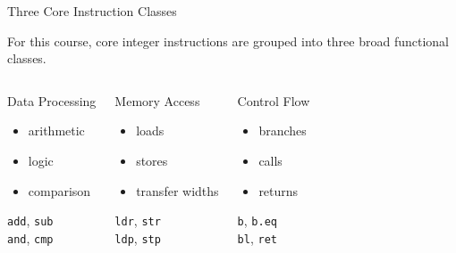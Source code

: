 \documentclass[aspectratio=169,11pt,t]{beamer}
\newcommand{\code}[1]{\texttt{#1}}
\begin{document}
\begin{frame}{Three Core Instruction Classes}

For this course,
core integer instructions
are grouped into three broad functional classes.

\vspace{0.15cm}

\begin{columns}[T,onlytextwidth]


\begin{block}{Data Processing}
\begin{itemize}
  \item arithmetic
  \item logic
  \item comparison
\end{itemize}

\centering

\code{add}, \code{sub}\\
\code{and}, \code{cmp}

\end{block}


\begin{block}{Memory Access}
\begin{itemize}
  \item loads
  \item stores
  \item transfer widths
\end{itemize}

\centering

\code{ldr}, \code{str}\\
\code{ldp}, \code{stp}

\end{block}


\begin{block}{Control Flow}
\begin{itemize}
  \item branches
  \item calls
  \item returns
\end{itemize}

\centering

\code{b}, \code{b.eq}\\
\code{bl}, \code{ret}

\end{block}

\end{columns}

\end{frame}
\end{document}
